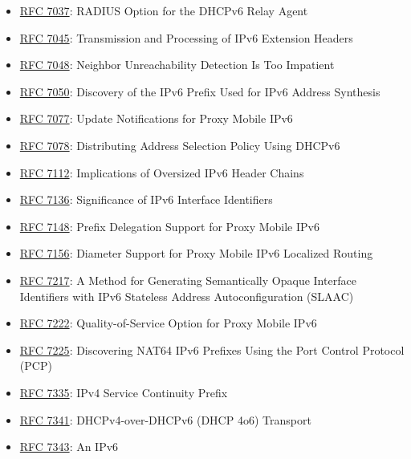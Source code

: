 \documentclass[
]{article}
\begin{document}
\begin{itemize}
  Implications of IPv6 Fragmentation with IPv6 Neighbor Discovery
\item
  \href{https://www.rfc-editor.org/info/rfc7037}{RFC 7037}: RADIUS
  Option for the DHCPv6 Relay Agent
\item
  \href{https://www.rfc-editor.org/info/rfc7045}{RFC 7045}: Transmission
  and Processing of IPv6 Extension Headers
\item
  \href{https://www.rfc-editor.org/info/rfc7048}{RFC 7048}: Neighbor
  Unreachability Detection Is Too Impatient
\item
  \href{https://www.rfc-editor.org/info/rfc7050}{RFC 7050}: Discovery of
  the IPv6 Prefix Used for IPv6 Address Synthesis
\item
  \href{https://www.rfc-editor.org/info/rfc7077}{RFC 7077}: Update
  Notifications for Proxy Mobile IPv6
\item
  \href{https://www.rfc-editor.org/info/rfc7078}{RFC 7078}: Distributing
  Address Selection Policy Using DHCPv6
\item
  \href{https://www.rfc-editor.org/info/rfc7112}{RFC 7112}: Implications
  of Oversized IPv6 Header Chains
\item
  \href{https://www.rfc-editor.org/info/rfc7136}{RFC 7136}: Significance
  of IPv6 Interface Identifiers
\item
  \href{https://www.rfc-editor.org/info/rfc7148}{RFC 7148}: Prefix
  Delegation Support for Proxy Mobile IPv6
\item
  \href{https://www.rfc-editor.org/info/rfc7156}{RFC 7156}: Diameter
  Support for Proxy Mobile IPv6 Localized Routing
\item
  \href{https://www.rfc-editor.org/info/rfc7217}{RFC 7217}: A Method for
  Generating Semantically Opaque Interface Identifiers with IPv6
  Stateless Address Autoconfiguration (SLAAC)
\item
  \href{https://www.rfc-editor.org/info/rfc7222}{RFC 7222}:
  Quality-of-Service Option for Proxy Mobile IPv6
\item
  \href{https://www.rfc-editor.org/info/rfc7225}{RFC 7225}: Discovering
  NAT64 IPv6 Prefixes Using the Port Control Protocol (PCP)
\item
  \href{https://www.rfc-editor.org/info/rfc7335}{RFC 7335}: IPv4 Service
  Continuity Prefix
\item
  \href{https://www.rfc-editor.org/info/rfc7341}{RFC 7341}:
  DHCPv4-over-DHCPv6 (DHCP 4o6) Transport
\item
  \href{https://www.rfc-editor.org/info/rfc7343}{RFC 7343}: An IPv6

\end{itemize}
\end{document}

